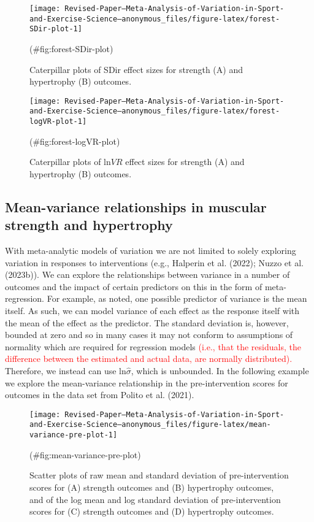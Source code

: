 \documentclass[
]{article}
\begin{document}
\begin{figure}

{\centering \texttt{[image: Revised-Paper---Meta-Analysis-of-Variation-in-Sport-and-Exercise-Science---anonymous\_files/figure-latex/forest-SDir-plot-1]} 

}

\caption{Caterpillar plots of SDir effect sizes for strength (A) and hypertrophy (B) outcomes.}(\#fig:forest-SDir-plot)
\end{figure}
\begin{figure}

{\centering \texttt{[image: Revised-Paper---Meta-Analysis-of-Variation-in-Sport-and-Exercise-Science---anonymous\_files/figure-latex/forest-logVR-plot-1]} 

}

\caption{Caterpillar plots of ln$VR$ effect sizes for strength (A) and hypertrophy (B) outcomes.}(\#fig:forest-logVR-plot)
\end{figure}

\hypertarget{mean-variance-relationships-in-muscular-strength-and-hypertrophy}{%
\subsection{Mean-variance relationships in muscular strength and hypertrophy}\label{mean-variance-relationships-in-muscular-strength-and-hypertrophy}}

With meta-analytic models of variation we are not limited to solely exploring variation in responses to interventions (e.g., Halperin et al. (2022); Nuzzo et al. (2023b)). We can explore the relationships between variance in a number of outcomes and the impact of certain predictors on this in the form of meta-regression. For example, as noted, one possible predictor of variance is the mean itself. As such, we can model variance of each effect as the response itself with the mean of the effect as the predictor. The standard deviation is, however, bounded at zero and so in many cases it may not conform to assumptions of normality which are required for regression models \textcolor{red}{(i.e., that the residuals, the difference between the estimated and actual data, are normally distributed).} Therefore, we instead can use \(\textrm{ln}\hat\sigma\), which is unbounded. In the following example we explore the mean-variance relationship in the pre-intervention scores for outcomes in the data set from Polito et al. (2021).

\begin{figure}

{\centering \texttt{[image: Revised-Paper---Meta-Analysis-of-Variation-in-Sport-and-Exercise-Science---anonymous\_files/figure-latex/mean-variance-pre-plot-1]} 

}

\caption{Scatter plots of raw mean and standard deviation of pre-intervention scores for (A) strength outcomes and (B) hypertrophy outcomes, and of the log mean and log standard deviation of pre-intervention scores for (C) strength outcomes and (D) hypertrophy outcomes.}(\#fig:mean-variance-pre-plot)
\end{figure}
\end{document}
